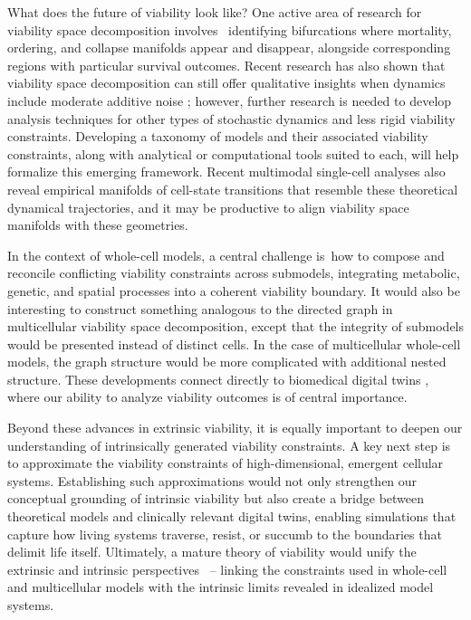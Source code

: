 \documentclass{article}
\begin{document}
What does the future of viability look like? One active area of research for viability space decomposition involves  identifying bifurcations where mortality, ordering, and collapse manifolds appear and disappear, alongside corresponding regions with particular survival outcomes. Recent research has also shown that viability space decomposition can still offer qualitative insights when dynamics include moderate additive noise \cite{mcshaffrey_shaking_2025}; however, further research is needed to develop analysis techniques for other types of stochastic dynamics and less rigid viability constraints. Developing a taxonomy of models and their associated viability constraints, along with analytical or computational tools suited to each, will help formalize this emerging framework. Recent multimodal single-cell analyses \cite{hao_integrated_2021,weiler_cellrank_2024} also reveal empirical manifolds of cell-state transitions that resemble these theoretical dynamical trajectories, and it may be productive to align viability space manifolds with these geometries.

In the context of whole-cell models, a central challenge is how to compose and reconcile conflicting viability constraints across submodels, integrating metabolic, genetic, and spatial processes into a coherent viability boundary. It would also be interesting to construct something analogous to the directed graph in multicellular viability space decomposition, except that the integrity of submodels would be presented instead of distinct cells. In the case of multicellular whole-cell models, the graph structure would be more complicated with additional nested structure. These developments connect directly to biomedical digital twins \cite{casola_opportunities_2023}, where our ability to analyze viability outcomes is of central importance.

Beyond these advances in extrinsic viability, it is equally important to deepen our understanding of intrinsically generated viability constraints. A key next step is to approximate the viability constraints of high-dimensional, emergent cellular systems. Establishing such approximations would not only strengthen our conceptual grounding of intrinsic viability but also create a bridge between theoretical models and clinically relevant digital twins, enabling simulations that capture how living systems traverse, resist, or succumb to the boundaries that delimit life itself. Ultimately, a mature theory of viability would unify the extrinsic and intrinsic perspectives  – linking the constraints used in whole-cell and multicellular models with the intrinsic limits revealed in idealized model systems. 
\end{document}
